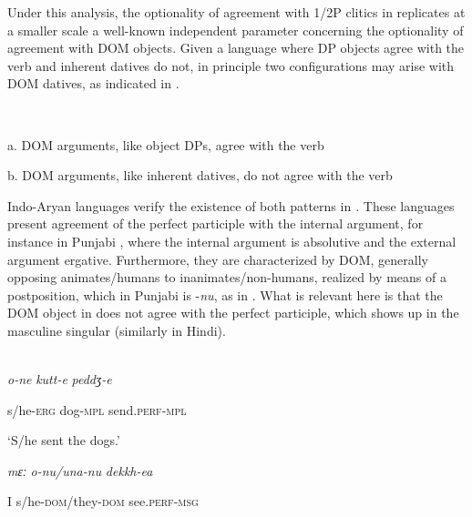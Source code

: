 \documentclass[output=paper]{langscibook}
\begin{document}
Under this analysis, the optionality of agreement with 1/2P clitics in  replicates at a smaller scale a well-known independent parameter concerning the optionality of agreement with DOM objects. Given a language where DP objects agree with the verb and inherent datives do not, in principle two configurations may arise with DOM datives, as indicated in .

\ea\label{ex:key:}
{} \\
\z

a.  DOM arguments, like object DPs, agree with the verb



b.  DOM arguments, like inherent datives, do not agree with the verb


Indo-Aryan languages verify the existence of both patterns in \emph{.} These languages present agreement of the perfect participle with the internal argument, for instance in Punjabi , where the internal argument is absolutive and the external argument ergative. Furthermore, they are characterized by DOM, generally opposing animates/humans to inanimates/non-humans, realized by means of a postposition, which in Punjabi is -\textit{nu}, as in . What is relevant here is that the DOM object in  does not agree with the perfect participle, which shows up in the masculine singular (similarly in Hindi).

\ea\label{ex:key:}
{}\\


\ea\label{ex:manzini:18a}  \textit{o-ne}     \textit{kutt-e}     \textit{peddʒ-e}

s/he-\textsc{erg}   dog-\textsc{mpl}   send.\textsc{perf-mpl} 


‘S/he sent the dogs.’  



\ex\label{ex:manzini:18b}  \textit{mɛː}   \textit{o-nu/una-nu}       \textit{dekkh-ea}

I   s/he\textsc{{}-dom}/they\textsc{{}-dom}    see.\textsc{perf-msg}
\end{document}

